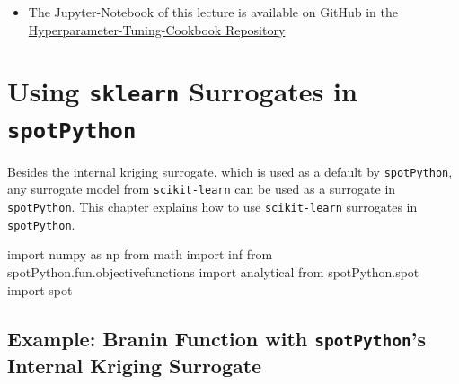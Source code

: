 \documentclass[
  letterpaper,
  DIV=11,
  numbers=noendperiod]{scrreprt}
\newenvironment{Shaded}{\begin{snugshade}}{\end{snugshade}}
\newcommand{\ImportTok}[1]{\textcolor[rgb]{0.00,0.46,0.62}{#1}}
\newcommand{\NormalTok}[1]{\textcolor[rgb]{0.00,0.23,0.31}{#1}}
\providecommand{\tightlist}{%
  \setlength{\itemsep}{0pt}\setlength{\parskip}{0pt}}\usepackage{longtable,booktabs,array}
\begin{document}
\begin{tcolorbox}[enhanced jigsaw, rightrule=.15mm, coltitle=black, title=\textcolor{quarto-callout-note-color}{\faInfo}\hspace{0.5em}{Note}, opacitybacktitle=0.6, bottomrule=.15mm, opacityback=0, left=2mm, colback=white, leftrule=.75mm, colframe=quarto-callout-note-color-frame, colbacktitle=quarto-callout-note-color!10!white, toprule=.15mm, toptitle=1mm, bottomtitle=1mm, titlerule=0mm, breakable, arc=.35mm]

\begin{itemize}
\tightlist
\item
  The Jupyter-Notebook of this lecture is available on GitHub in the
  \href{https://github.com/sequential-parameter-optimization/Hyperparameter-Tuning-Cookbook/blob/main/009_num_spot_anisotropic.ipynb}{Hyperparameter-Tuning-Cookbook
  Repository}
\end{itemize}

\end{tcolorbox}

\chapter{\texorpdfstring{Using \texttt{sklearn} Surrogates in
\texttt{spotPython}}{Using sklearn Surrogates in spotPython}}\label{sec-sklearn-surrogates}

Besides the internal kriging surrogate, which is used as a default by
\texttt{spotPython}, any surrogate model from \texttt{scikit-learn} can
be used as a surrogate in \texttt{spotPython}. This chapter explains how
to use \texttt{scikit-learn} surrogates in \texttt{spotPython}.

\begin{Shaded}
\begin{Highlighting}[]
\ImportTok{import}\NormalTok{ numpy }\ImportTok{as}\NormalTok{ np}
\ImportTok{from}\NormalTok{ math }\ImportTok{import}\NormalTok{ inf}
\ImportTok{from}\NormalTok{ spotPython.fun.objectivefunctions }\ImportTok{import}\NormalTok{ analytical}
\ImportTok{from}\NormalTok{ spotPython.spot }\ImportTok{import}\NormalTok{ spot}
\end{Highlighting}
\end{Shaded}

\section{\texorpdfstring{Example: Branin Function with
\texttt{spotPython}'s Internal Kriging
Surrogate}{Example: Branin Function with spotPython's Internal Kriging Surrogate}}\label{example-branin-function-with-spotpythons-internal-kriging-surrogate}
\end{document}

